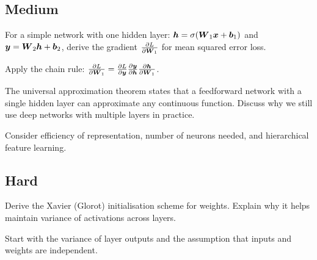 \subsection*{Medium}

\begin{exercisebox}[medium]
\begin{problem}
For a simple network with one hidden layer: $\boldsymbol{h} = \sigma(\boldsymbol{W}_1\boldsymbol{x} + \boldsymbol{b}_1)$ and $\boldsymbol{y} = \boldsymbol{W}_2\boldsymbol{h} + \boldsymbol{b}_2$, derive the gradient $\frac{\partial L}{\partial \boldsymbol{W}_1}$ for mean squared error loss.
\end{problem}
\begin{hintbox}
Apply the chain rule: $\frac{\partial L}{\partial \boldsymbol{W}_1} = \frac{\partial L}{\partial \boldsymbol{y}} \frac{\partial \boldsymbol{y}}{\partial \boldsymbol{h}} \frac{\partial \boldsymbol{h}}{\partial \boldsymbol{W}_1}$.
\end{hintbox}
\end{exercisebox}


\begin{exercisebox}[medium]
\begin{problem}
The universal approximation theorem states that a feedforward network with a single hidden layer can approximate any continuous function. Discuss why we still use deep networks with multiple layers in practice.
\end{problem}
\begin{hintbox}
Consider efficiency of representation, number of neurons needed, and hierarchical feature learning.
\end{hintbox}
\end{exercisebox}


\subsection*{Hard}

\begin{exercisebox}[hard]
\begin{problem}
Derive the Xavier (Glorot) initialisation scheme for weights. Explain why it helps maintain variance of activations across layers.
\end{problem}
\begin{hintbox}
Start with the variance of layer outputs and the assumption that inputs and weights are independent.
\end{hintbox}
\end{exercisebox}


